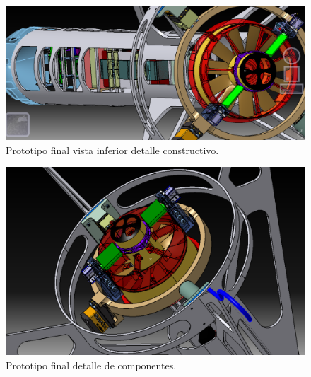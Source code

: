 \begin{figure}[htb]
    \centering
    \includegraphics[width=\linewidth]{fig/design/v6_5}
    \caption{Prototipo final vista inferior detalle constructivo.}
    \label{fig:design/v6_5}
\end{figure}


\begin{figure}[htb]
    \centering
    \includegraphics[width=\linewidth]{fig/design/v6_6}
    \caption{Prototipo final detalle de componentes.}
    \label{fig:design/v6_6}
\end{figure}
